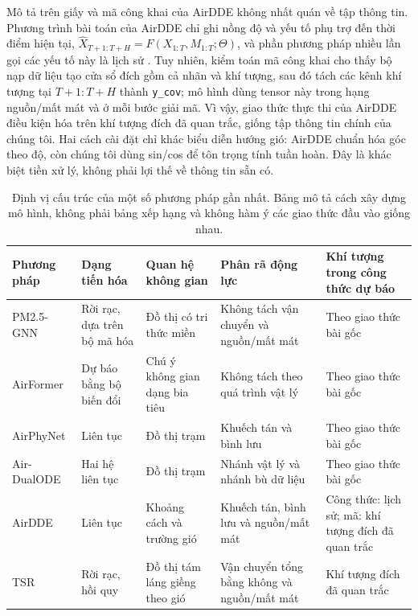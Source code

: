 \documentclass[10pt,a4paper]{article}
\newcommand{\modelname}{TSR}
\begin{document}
Mô tả trên giấy và mã công khai của AirDDE không nhất quán về tập thông tin. Phương trình bài toán của AirDDE chỉ ghi nồng độ và yếu tố phụ trợ đến thời điểm hiện tại, $\widehat{X}_{T+1:T+H}=F(X_{1:T},M_{1:T};\Theta)$, và phần phương pháp nhiều lần gọi các yếu tố này là lịch sử \citep{wu2026airdde}. Tuy nhiên, kiểm toán mã công khai cho thấy bộ nạp dữ liệu tạo cửa sổ đích gồm cả nhãn và khí tượng, sau đó tách các kênh khí tượng tại $T+1{:}T+H$ thành \texttt{y\_cov}; mô hình dùng tensor này trong hạng nguồn/mất mát và ở mỗi bước giải mã. Vì vậy, giao thức thực thi của AirDDE điều kiện hóa trên khí tượng đích đã quan trắc, giống tập thông tin chính của chúng tôi. Hai cách cài đặt chỉ khác biểu diễn hướng gió: AirDDE chuẩn hóa góc theo độ, còn chúng tôi dùng sin/cos để tôn trọng tính tuần hoàn. Đây là khác biệt tiền xử lý, không phải lợi thế về thông tin sẵn có.

\begin{table}[t]
  \centering
  \caption{Định vị cấu trúc của một số phương pháp gần nhất. Bảng mô tả cách xây dựng mô hình, không phải bảng xếp hạng và không hàm ý các giao thức đầu vào giống nhau.}
  \label{tab:method-positioning}
  \scriptsize
  \begin{tabularx}{\textwidth}{@{}p{1.45cm}p{1.8cm}p{2.1cm}Xp{2cm}@{}}
    \toprule
    Phương pháp & Dạng tiến hóa & Quan hệ không gian & Phân rã động lực & Khí tượng trong công thức dự báo \\
    \midrule
    PM2.5-GNN & Rời rạc, dựa trên bộ mã hóa & Đồ thị có tri thức miền & Không tách vận chuyển và nguồn/mất mát & Theo giao thức bài gốc \\
    AirFormer & Dự báo bằng bộ biến đổi & Chú ý không gian dạng bia tiêu & Không tách theo quá trình vật lý & Theo giao thức bài gốc \\
    AirPhyNet & Liên tục & Đồ thị trạm & Khuếch tán và bình lưu & Theo giao thức bài gốc \\
    Air-DualODE & Hai hệ liên tục & Đồ thị trạm & Nhánh vật lý và nhánh bù dữ liệu & Theo giao thức bài gốc \\
    AirDDE & Liên tục & Khoảng cách và trường gió & Khuếch tán, bình lưu và nguồn/mất mát & Công thức: lịch sử; mã: khí tượng đích đã quan trắc \\
    \modelname{} & Rời rạc, hồi quy & Đồ thị tám láng giềng theo gió & Vận chuyển tổng bằng không và nguồn/mất mát & Khí tượng đích đã quan trắc \\
    \bottomrule
  \end{tabularx}
\end{table}
\end{document}
